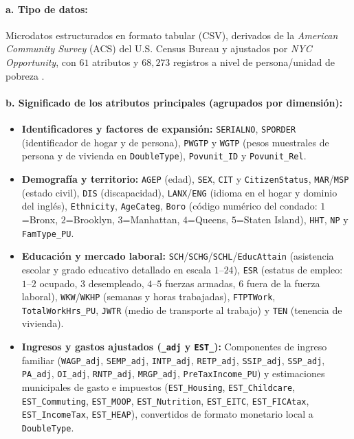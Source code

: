 \paragraph{a. Tipo de datos:} Microdatos estructurados en formato tabular (CSV), derivados de la \textit{American Community Survey} (ACS) del U.S. Census Bureau y ajustados por \textit{NYC Opportunity}, con $61$ atributos y $68,273$ registros a nivel de persona/unidad de pobreza \cite{nyc_poverty_data_2018, acs_pums_dict_2018}.

\paragraph{b. Significado de los atributos principales (agrupados por dimensión):}
\begin{itemize}
    \item \textbf{Identificadores y factores de expansión:} \texttt{SERIALNO}, \texttt{SPORDER} (identificador de hogar y de persona), \texttt{PWGTP} y \texttt{WGTP} (pesos muestrales de persona y de vivienda en \texttt{DoubleType}), \texttt{Povunit\_ID} y \texttt{Povunit\_Rel}.
    \item \textbf{Demografía y territorio:} \texttt{AGEP} (edad), \texttt{SEX}, \texttt{CIT} y \texttt{CitizenStatus}, \texttt{MAR}/\texttt{MSP} (estado civil), \texttt{DIS} (discapacidad), \texttt{LANX}/\texttt{ENG} (idioma en el hogar y dominio del inglés), \texttt{Ethnicity}, \texttt{AgeCateg}, \texttt{Boro} (código numérico del condado: $1$=Bronx, $2$=Brooklyn, $3$=Manhattan, $4$=Queens, $5$=Staten Island), \texttt{HHT}, \texttt{NP} y \texttt{FamType\_PU}.
    \item \textbf{Educación y mercado laboral:} \texttt{SCH}/\texttt{SCHG}/\texttt{SCHL}/\texttt{EducAttain} (asistencia escolar y grado educativo detallado en escala $1\text{--}24$), \texttt{ESR} (estatus de empleo: $1\text{--}2$ ocupado, $3$ desempleado, $4\text{--}5$ fuerzas armadas, $6$ fuera de la fuerza laboral), \texttt{WKW}/\texttt{WKHP} (semanas y horas trabajadas), \texttt{FTPTWork}, \texttt{TotalWorkHrs\_PU}, \texttt{JWTR} (medio de transporte al trabajo) y \texttt{TEN} (tenencia de vivienda).
    \item \textbf{Ingresos y gastos ajustados (\texttt{\_adj} y \texttt{EST\_}):} Componentes de ingreso familiar (\texttt{WAGP\_adj}, \texttt{SEMP\_adj}, \texttt{INTP\_adj}, \texttt{RETP\_adj}, \texttt{SSIP\_adj}, \texttt{SSP\_adj}, \texttt{PA\_adj}, \texttt{OI\_adj}, \texttt{RNTP\_adj}, \texttt{MRGP\_adj}, \texttt{PreTaxIncome\_PU}) y estimaciones municipales de gasto e impuestos (\texttt{EST\_Housing}, \texttt{EST\_Childcare}, \texttt{EST\_Commuting}, \texttt{EST\_MOOP}, \texttt{EST\_Nutrition}, \texttt{EST\_EITC}, \texttt{EST\_FICAtax}, \texttt{EST\_IncomeTax}, \texttt{EST\_HEAP}), convertidos de formato monetario local a \texttt{DoubleType}.

\end{itemize}

